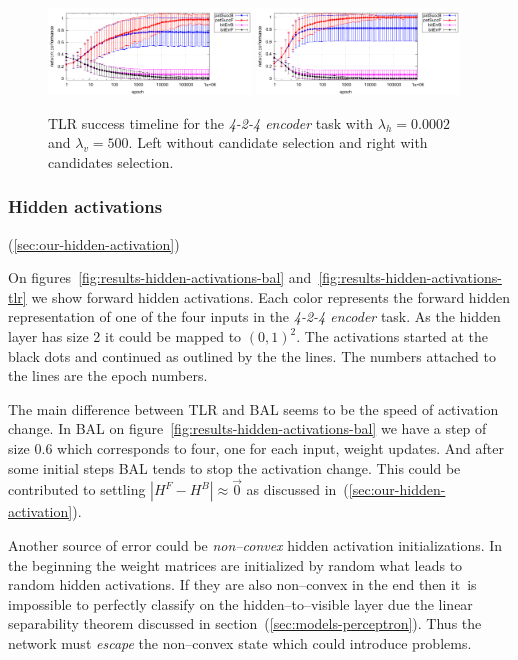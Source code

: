 \begin{figure}[H]
  \centering
  \includegraphics[width=0.48\textwidth]{img/tlr-auto4-best-perf.pdf}   
  \includegraphics[width=0.48\textwidth]{img/tlr-auto4-best-can.pdf}      
  \caption{TLR success timeline for the \emph{4-2-4 encoder} task with $\lambda_h=0.0002$ and $\lambda_v=500$. Left without candidate selection and right with candidates selection.}
  \label{fig:results-tlr-auto4-epoch} 
\end{figure}

\subsubsection{Hidden activations}
(\ref{sec:our-hidden-activation})  

On figures~\ref{fig:results-hidden-activations-bal} and~\ref{fig:results-hidden-activations-tlr} we show forward hidden activations. Each color represents the forward hidden representation of one of the four inputs in the \emph{4-2-4 encoder} task. As the hidden layer has size 2 it could be mapped to $(0,1)^2$. The activations started at the black dots and continued as outlined by the the lines. The numbers attached to the lines are the epoch numbers. 

The main difference between TLR and BAL seems to be the speed of activation change. In BAL on figure~\ref{fig:results-hidden-activations-bal} we have a step of size 0.6 which corresponds to four, one for each input, weight updates. And after some initial steps BAL tends to stop the activation change. This could be contributed to settling $|H^F-H^B| \approx \overrightarrow{0}$ as discussed in~(\ref{sec:our-hidden-activation}). 

Another source of error could be \emph{non--convex} hidden activation initializations. In the beginning the weight matrices are initialized by random what leads to random hidden activations. If they are also non--convex in the end then it~is impossible to perfectly classify on the hidden--to--visible layer due the linear separability theorem discussed in section~(\ref{sec:models-perceptron}). Thus the network must \emph{escape} the non--convex state which could introduce problems. 

